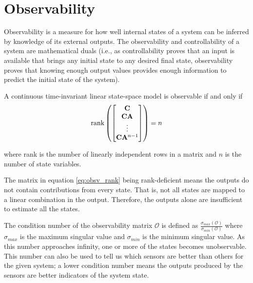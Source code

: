 \section{Observability}

Observability is a measure for how well internal \glspl{state} of a \gls{system}
can be inferred by knowledge of its external \glspl{output}. The observability
and controllability of a \gls{system} are mathematical duals (i.e., as
controllability proves that an \gls{input} is available that brings any initial
\gls{state} to any desired final \gls{state}, observability proves that knowing
enough \gls{output} values provides enough information to predict the initial
\gls{state} of the \gls{system}).
\begin{theorem}[Observability]
  A continuous \gls{time-invariant} linear state-space \gls{model} is observable
  if and only if
  \begin{equation}
    \operatorname{rank}\left(
    \begin{bmatrix}
      \mathbf{C} \\
      \mathbf{C}\mathbf{A} \\
      \vdots \\
      \mathbf{C}\mathbf{A}^{n-1}
    \end{bmatrix}\right) = n \label{eq:obsv_rank}
  \end{equation}

  where rank is the number of linearly independent rows in a matrix and $n$ is
  the number of \gls{state} variables.
\end{theorem}

The matrix in equation \eqref{eq:obsv_rank} being rank-deficient means the
\glspl{output} do not contain contributions from every \gls{state}. That is, not
all \glspl{state} are mapped to a linear combination in the \gls{output}.
Therefore, the \glspl{output} alone are insufficient to estimate all the
\glspl{state}.

The condition number of the observability matrix $\mathcal{O}$ is defined as
$\frac{\sigma_{max}(\mathcal{O})}{\sigma_{min}(\mathcal{O})}$ where
$\sigma_{max}$ is the maximum singular value and
$\sigma_{min}$ is the minimum singular value. As this number approaches
infinity, one or more of the \glspl{state} becomes unobservable. This number can
also be used to tell us which sensors are better than others for the given
\gls{system}; a lower condition number means the \glspl{output} produced by the
sensors are better indicators of the \gls{system} \gls{state}.
